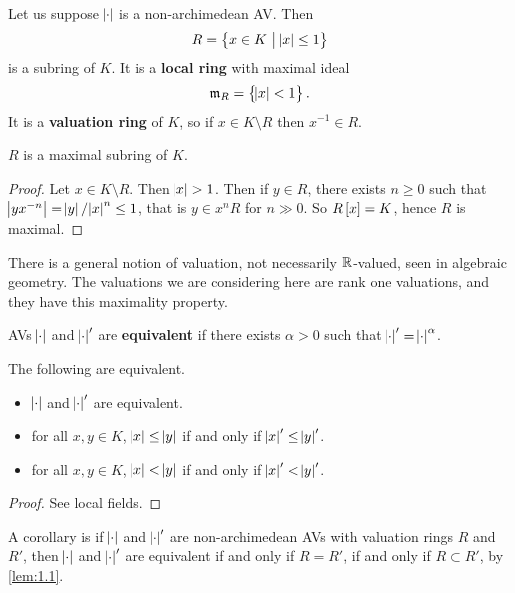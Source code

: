 Let us suppose $ \abs{\cdot} $ is a non-archimedean AV. Then
$$ R = \cbr{x \in K \st \abs{x} \le 1} $$
is a subring of $ K $. It is a \textbf{local ring} with maximal ideal
$$ \mmm_R = \cbr{\abs{x} < 1}. $$
It is a \textbf{valuation ring} of $ K $, so if $ x \in K \setminus R $ then $ x^{-1} \in R $.

\begin{lemma}
\label{lem:1.1}
$ R $ is a maximal subring of $ K $.
\end{lemma}

\begin{proof}
Let $ x \in K \setminus R $. Then $ \abs{x} > 1 $. Then if $ y \in R $, there exists $ n \ge 0 $ such that $ \abs{yx^{-n}} = \abs{y} / \abs{x}^n \le 1 $, that is $ y \in x^nR $ for $ n \gg 0 $. So $ R\sbr{x} = K $, hence $ R $ is maximal.
\end{proof}

\begin{remark*}
There is a general notion of valuation, not necessarily $ \mathbb{R} $-valued, seen in algebraic geometry. The valuations we are considering here are rank one valuations, and they have this maximality property.
\end{remark*}

AVs $ \abs{\cdot} $ and $ \abs{\cdot}' $ are \textbf{equivalent} if there exists $ \alpha > 0 $ such that $ \abs{\cdot}' = \abs{\cdot}^\alpha $.

\begin{proposition}
\label{prop:1.2}
The following are equivalent.
\begin{itemize}
\item $ \abs{\cdot} $ and $ \abs{\cdot}' $ are equivalent.
\item for all $ x, y \in K $, $ \abs{x} \le \abs{y} $ if and only if $ \abs{x}' \le \abs{y}' $.
\item for all $ x, y \in K $, $ \abs{x} < \abs{y} $ if and only if $ \abs{x}' < \abs{y}' $.
\end{itemize}
\end{proposition}

\begin{proof}
See local fields.
\end{proof}

A corollary is if $ \abs{\cdot} $ and $ \abs{\cdot}' $ are non-archimedean AVs with valuation rings $ R $ and $ R' $, then $ \abs{\cdot} $ and $ \abs{\cdot}' $ are equivalent if and only if $ R = R' $, if and only if $ R \subset R' $, by \ref{lem:1.1}.

